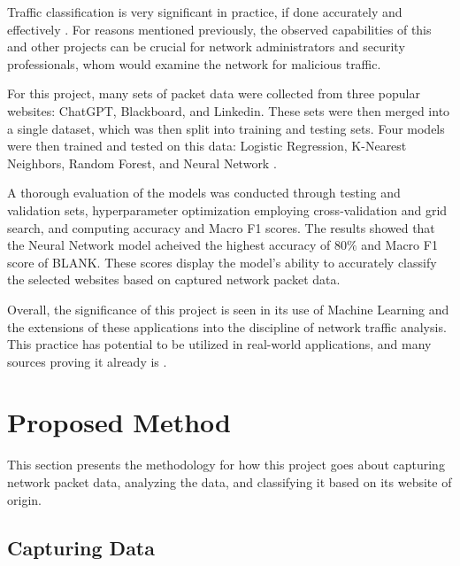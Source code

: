 \documentclass[10pt,sigconf,letterpaper,nonacm]{acmart}
\begin{document}
  Traffic classification is very significant in practice, if done accurately and effectively \cite{10.1109/TNET.2014.2320577}. For reasons mentioned previously, the observed capabilities of this and other projects 
  can be crucial for network administrators and security professionals, whom would examine the network for malicious traffic.

  For this project, many sets of packet data were collected from three popular websites: ChatGPT, Blackboard, and Linkedin. These sets were then merged into a single dataset, which was then split into training and testing sets. 
  Four models were then trained and tested on this data: Logistic Regression, K-Nearest Neighbors, Random Forest, and Neural Network \cite{scikit-learn}. 

  A thorough evaluation of the models was conducted through testing and validation sets, hyperparameter optimization employing cross-validation and grid search, and computing accuracy and Macro F1 scores. The results showed that the Neural Network model 
  acheived the highest accuracy of $80\%$ and Macro F1 score of BLANK. %
  These scores display the model's ability to accurately classify the selected websites based on captured network packet data.

  Overall, the significance of this project is seen in its use of Machine Learning and the extensions of these applications into the discipline of network traffic analysis. This practice has potential to be utilized in real-world applications, and many sources
  proving it already is \cite{10.5555/3432601.3432608}. 

\section{Proposed Method}
This section presents the methodology for how this project goes about capturing network packet data, analyzing the data, and classifying it based on its website of origin.

\subsection{Capturing Data}
\end{document}
